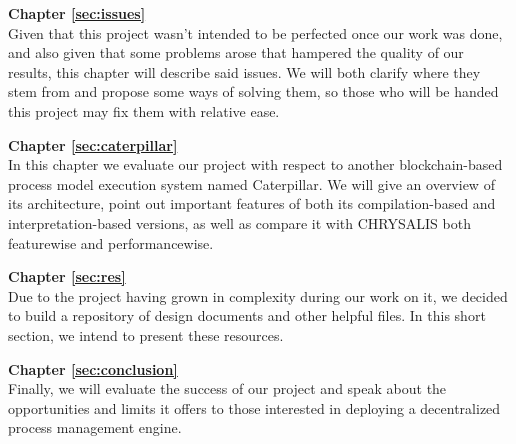 \textbf{Chapter \ref{sec:issues}} \\[0.2em]
Given that this project wasn't intended to be perfected once our work was done, and also given that some problems arose that hampered the quality of our results, this chapter will describe said issues. We will both clarify where they stem from and propose some ways of solving them, so those who will be handed this project may fix them with relative ease.

\textbf{Chapter \ref{sec:caterpillar}} \\[0.2em]
In this chapter we evaluate our project with respect to another blockchain-based process model execution system named Caterpillar. We will give an overview of its architecture, point out important features of both its compilation-based and interpretation-based versions, as well as compare it with CHRYSALIS both featurewise and performancewise.

\textbf{Chapter \ref{sec:res}} \\[0.2em]
Due to the project having grown in complexity during our work on it, we decided to build a repository of design documents and other helpful files. In this short section, we intend to present these resources.

\textbf{Chapter \ref{sec:conclusion}} \\[0.2em]
Finally, we will evaluate the success of our project and speak about the opportunities and limits it offers to those interested in deploying a decentralized process management engine.
